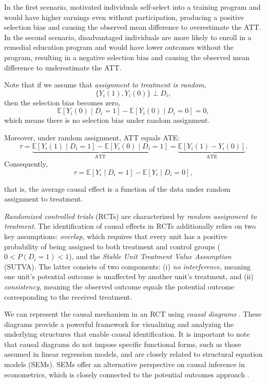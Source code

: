 In the first scenario, motivated individuals self-select into a training program and would have higher earnings even without participation, producing a positive selection bias and causing the observed mean difference to overestimate the ATT. In the second scenario, disadvantaged individuals are more likely to enroll in a remedial education program and would have lower outcomes without the program, resulting in a negative selection bias and causing the observed mean difference to underestimate the ATT.

Note that if we assume that \textit{assignment to treatment is random},
\[
\{ Y_i(1), Y_i(0) \} \perp D_i,
\]
then the selection bias becomes zero,
\[
\mathbb{E}[Y_i(0) \mid D_i = 1] - \mathbb{E}[Y_i(0) \mid D_i = 0] = 0,
\]
which means there is no selection bias under random assignment.

Moreover, under random assignment, ATT equals ATE:
\[
\tau = \underbrace{\mathbb{E}[Y_i(1)\mid D_i=1]-\mathbb{E}[Y_i(0)\mid D_i=1]}_{\text{ATT}} 
= \underbrace{\mathbb{E}[Y_i(1)-Y_i(0)]}_{\text{ATE}}.
\]
Consequently,
\begin{equation*}
	\tau=\mathbb{E}[Y_i \mid D_i = 1] - \mathbb{E}[Y_i \mid D_i = 0],
\end{equation*}

that is, the average causal effect is a function of the data under random assignment to treatment.
 
\textit{Randomized controlled trials} (RCTs) are characterized by \textit{random assignment to treatment}. The identification of causal effects in RCTs additionally relies on two key assumptions: \textit{overlap}, which requires that every unit has a positive probability of being assigned to both treatment and control groups ($0 < P(D_i = 1) < 1$), and the \textit{Stable Unit Treatment Value Assumption} (SUTVA). The latter consists of two components: (i) \textit{no interference}, meaning one unit’s potential outcome is unaffected by another unit’s treatment, and (ii) \textit{consistency}, meaning the observed outcome equals the potential outcome corresponding to the received treatment.

We can represent the causal mechanism in an RCT using \textit{causal diagrams} \cite{pearl1995causal,pearl2018book}. These diagrams provide a powerful framework for visualizing and analyzing the underlying structures that enable causal identification. It is important to note that causal diagrams do not impose specific functional forms, such as those assumed in linear regression models, and are closely related to structural equation models (SEMs). SEMs offer an alternative perspective on causal inference in econometrics, which is closely connected to the potential outcomes approach \cite{haavelmo1943statistical,marschak1944random,imbens2014ivperspective}.

